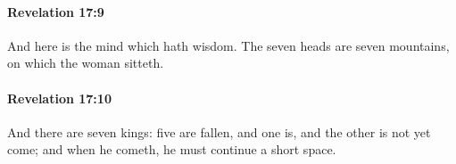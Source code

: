 		\paragraph{Revelation 17:9} %
			\label{REVELATIONNT-17-9}

			And here is the mind which hath wisdom. The seven heads are seven mountains, on which the woman sitteth.

			\begin{framed}
			\scriptsize
				\begin{compactdesc}
					\item[SBLG] 
				\end{compactdesc}
			\end{framed}

		\paragraph{Revelation 17:10} %
			\label{REVELATIONNT-17-10}

			And there are seven kings: five are fallen, and one is, and the other is not yet come; and when he cometh, he must continue a short space.

